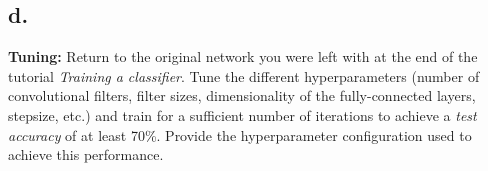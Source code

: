 \documentclass{article}
\newcommand{\1}{\mathbf{1}}
\begin{document}
{\subsection*{d.}

\textbf{Tuning:} Return to the original network you were left with at the end of the tutorial \emph{Training a classifier}. Tune the different hyperparameters (number of convolutional filters, filter sizes, dimensionality of the fully-connected layers, stepsize, etc.) and train for a sufficient number of iterations to achieve a \emph{test accuracy} of at least 70\%. Provide the hyperparameter configuration used to achieve this performance.


}

\section*{}
\end{document}
